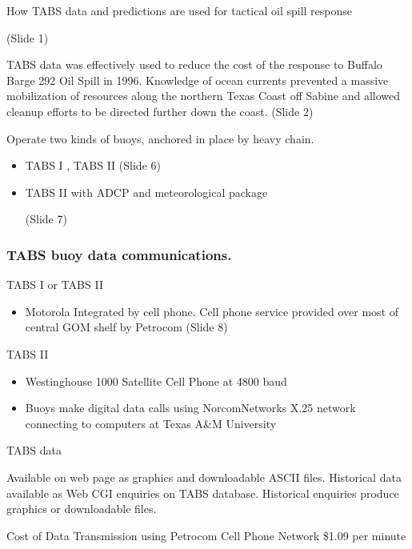How TABS data and predictions are used for tactical oil spill response 

  (Slide 1)

TABS data was effectively used to reduce the cost of the response to Buffalo Barge 292 Oil Spill 
in 1996. Knowledge of ocean currents prevented a massive mobilization of resources along the 
northern Texas Coast off Sabine and allowed cleanup efforts to be directed further down the 
coast. 
  (Slide 2)

Operate two kinds of buoys, anchored in place by heavy chain.
\begin{itemize}
\item TABS I , TABS II 
  (Slide 6)

\item TABS II with ADCP and meteorological package

  (Slide 7)
\end{itemize}

\subsubsection{TABS buoy data communications.}

TABS I or TABS II
\begin{itemize}
\item Motorola Integrated by cell phone. Cell phone service provided
over most of central GOM 
shelf by Petrocom 
  (Slide 8)
\end{itemize}

TABS II 
\begin{itemize}
\item    Westinghouse 1000 Satellite Cell Phone at 4800 baud
\item Buoys make digital data calls using NorcomNetworks X.25 network
  connecting to computers at Texas A\&M University
\end{itemize}

TABS data

Available on web page as graphics and downloadable ASCII files. Historical data available as 
Web CGI enquiries on TABS database.  Historical enquiries produce graphics or downloadable 
files.

Cost of Data Transmission using Petrocom Cell Phone Network
\$1.09 per minute

